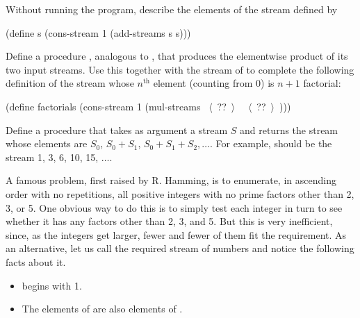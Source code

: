 \begin{exerciseGroup}
\label{Exercise 3.53}
 Without running the program,
describe the elements of the stream defined by

\begin{codeBlock}
(define s (cons-stream 1 (add-streams s s)))
\end{codeBlock}

\label{Exercise 3.54}
 Define a procedure
, analogous to , that produces the
elementwise product of its two input streams.  Use this together with the
stream of  to complete the following definition of the stream
whose \( n^{\mathrm{th}} \) element (counting from 0) is \( n + 1 \) factorial:

\begin{codeBlock}
(define factorials
  (cons-stream 1 (mul-streams ~\(\langle \)~??~\(\rangle \)~ ~\(\langle \)~??~\(\rangle \)~)))
\end{codeBlock}

\label{Exercise 3.55}
 Define a procedure
 that takes as argument a stream \( S \) and returns the
stream whose elements are \( S_0 \), \( S_0 + S_1 \), \( S_0 + S_1 + S_2, \dots \).
For example,  should be the
stream 1, 3, 6, 10, 15, \( \dots \).

\label{Exercise 3.56}
 A famous problem, first raised by
R. Hamming, is to enumerate, in ascending order with no repetitions, all
positive integers with no prime factors other than 2, 3, or 5.  One obvious way
to do this is to simply test each integer in turn to see whether it has any
factors other than 2, 3, and 5.  But this is very inefficient, since, as the
integers get larger, fewer and fewer of them fit the requirement.  As an
alternative, let us call the required stream of numbers  and notice the
following facts about it.

\begin{itemize}
\item
{} begins with 1.

\item
The elements of  are also
elements of .


\end{itemize}
\end{exerciseGroup}
